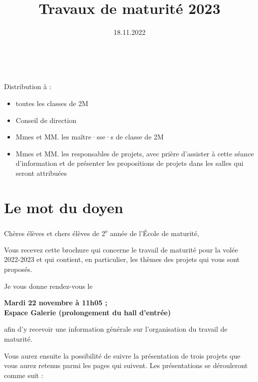 \documentclass[
  10pt,
  french,
  a5paper,
  openany]{book}
\title{Travaux de maturité 2023}
\author{}
\date{\vspace{-2.5em}18.11.2022}
\providecommand{\tightlist}{%
  \setlength{\itemsep}{0pt}\setlength{\parskip}{0pt}}
\begin{document}
\maketitle

{
\setcounter{tocdepth}{0}
\tableofcontents
}
\clearpage

~

\begin{center}

Distribution à :

\begin{itemize}
\tightlist
\item
  toutes les classes de 2M
\item
  Conseil de direction
\item
  Mmes et MM. les maître·sse·s de classe de 2M
\item
  Mmes et MM. les responsables de projets, avec prière d'assister à cette séance d'information et de présenter les propositions de projets dans les salles qui seront attribuées
\end{itemize}


\end{center}

\clearpage

\hypertarget{le-mot-du-doyen}{%
\chapter*{Le mot du doyen}\label{le-mot-du-doyen}}

Chères élèves et chers élèves de 2\textsuperscript{e} année de l'École de maturité,

Vous recevez cette brochure qui concerne le travail de maturité pour la volée 2022-2023 et qui contient, en particulier, les thèmes des projets qui vous sont proposés.

Je vous donne rendez-vous le

\begin{center}
\textbf{Mardi 22 novembre à 11h05 ;\\
Espace Galerie (prolongement du hall d'entrée)}

\end{center}

afin d'y recevoir une information générale sur l'organisation du travail de maturité.

Vous aurez ensuite la possibilité de suivre la présentation de trois projets que vous aurez retenus parmi les pages qui suivent. Les présentations se dérouleront comme suit :
\end{document}
